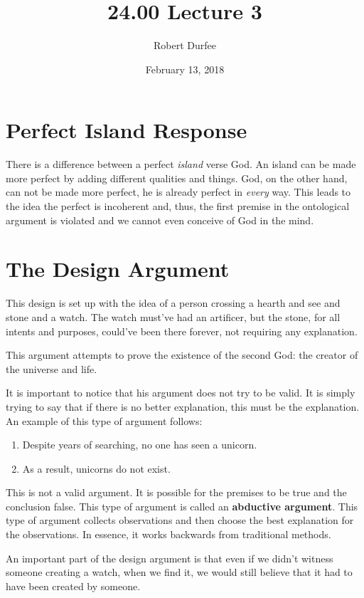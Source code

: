 \documentclass{article}
\title{ 24.00 Lecture 3 }
\author{ Robert Durfee }
\date{ February 13, 2018 }
\begin{document}
\maketitle

\section{ Perfect Island Response }

There is a difference between a perfect \textit{island} verse God. An island can
be made more perfect by adding different qualities and things. God, on the other
hand, can not be made more perfect, he is already perfect in \textit{every} way.
This leads to the idea the perfect is incoherent and, thus, the first premise in
the ontological argument is violated and we cannot even conceive of God in the
mind.

\section{The Design Argument}

This design is set up with the idea of a person crossing a hearth and see and
stone and a watch. The watch must've had an artificer, but the stone, for all
intents and purposes, could've been there forever, not requiring any
explanation.

This argument attempts to prove the existence of the second God: the creator of
the universe and life.

It is important to notice that his argument does not try to be valid. It is
simply trying to say that if there is no better explanation, this must be the
explanation. An example of this type of argument follows:

\begin{enumerate}
  \item Despite years of searching, no one has seen a unicorn.
  \item As a result, unicorns do not exist.
\end{enumerate}

This is not a valid argument. It is possible for the premises to be true and the
conclusion false. This type of argument is called an \textbf{abductive
argument}. This type of argument collects observations and then choose the best
explanation for the observations. In essence, it works backwards from
traditional methods.

An important part of the design argument is that even if we didn't witness
someone creating a watch, when we find it, we would still believe that it had to
have been created by someone.
\end{document}
